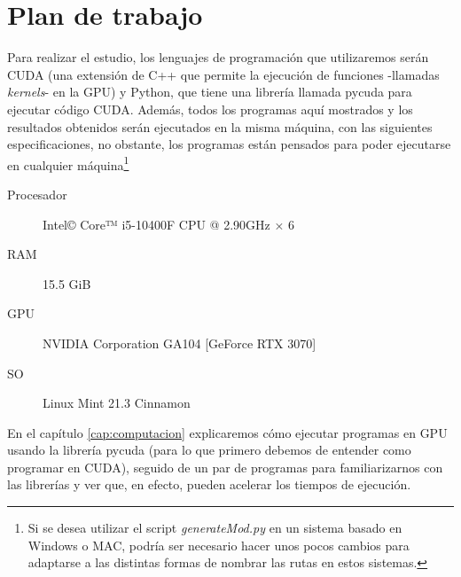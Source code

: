 \section{Plan de trabajo}
Para realizar el estudio, los lenguajes de programación que utilizaremos serán CUDA (una extensión de C++ que permite la ejecución de funciones -llamadas \emph{kernels}- en la \ac{GPU}) y Python, que tiene una librería llamada pycuda para ejecutar código \ac{CUDA}. Además, todos los programas aquí mostrados y los resultados obtenidos serán ejecutados en la misma máquina, con las siguientes especificaciones, no obstante, los programas están pensados para poder ejecutarse en cualquier máquina\footnote{Si se desea utilizar el script \textit{generateMod.py} en un sistema basado en Windows o MAC, podría ser necesario hacer unos pocos cambios para adaptarse a las distintas formas de nombrar las rutas en estos sistemas.}

\begin{description}
	\item[Procesador] Intel© Core™ i5-10400F CPU @ 2.90GHz × 6
	\item[RAM] 15.5 GiB
	\item[GPU] NVIDIA Corporation GA104 [GeForce RTX 3070]
	\item[SO] Linux Mint 21.3 Cinnamon
\end{description}

En el capítulo \ref{cap:computacion} explicaremos cómo ejecutar programas en \ac{GPU} usando la librería pycuda (para lo que primero debemos de entender como programar en CUDA), seguido de un par de programas para familiarizarnos con las librerías y ver que, en efecto, pueden acelerar los tiempos de ejecución.

